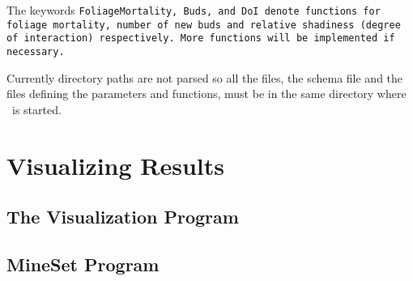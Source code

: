 The keywords \tt FoliageMortality\rm, \tt Buds\rm, and
\tt DoI \rm denote functions for foliage mortality, number of new buds 
and relative shadiness (degree of interaction) respectively. More functions
will be implemented if necessary.

Currently directory paths are not parsed so all the files,
the schema file and the files defining the parameters and functions,
must be in the same directory where \lignum\ is started.


\section{Visualizing Results}

\subsection{The Visualization Program}
\subsection{MineSet Program}








